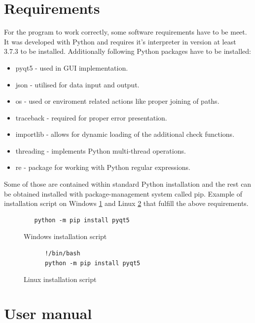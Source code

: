 \documentclass[a4paper,twoside,12pt]{book}
\begin{document}
\section{Requirements}
For the program to work correctly, some software requirements have to be meet. It was developed with 
Python and requires it's interpreter in version at least 3.7.3 to be installed. Additionally following Python packages
have to be installed:
\begin{itemize}
   \item pyqt5 - used in GUI implementation.
   \item json - utilised for data input and output.
   \item os - used or enviroment related actions like proper joining of paths.
   \item traceback - required for proper error presentation.
   \item importlib - allows for dynamic loading of the additional check functions.
   \item threading - implements Python multi-thread operations.
   \item re - package for working with Python regular expressions.
\end{itemize}

Some of those are contained within standard Python installation and the rest can be obtained installed with package-management 
system called pip. Example of installation script on Windows \ref{fig:windowsScript} and Linux \ref{fig:linuxScript} that fulfill 
the above requirements.

\begin{figure}
   \centering
   \begin{lstlisting}
   python -m pip install pyqt5
   \end{lstlisting}
   \caption{Windows installation script}
   \label{fig:windowsScript}
\end{figure}

\begin{figure}
   \centering
   \begin{lstlisting}
      !/bin/bash
      python -m pip install pyqt5
   \end{lstlisting}
   \caption{Linux installation script}
   \label{fig:linuxScript}
\end{figure}

\section{User manual}
\end{document}
